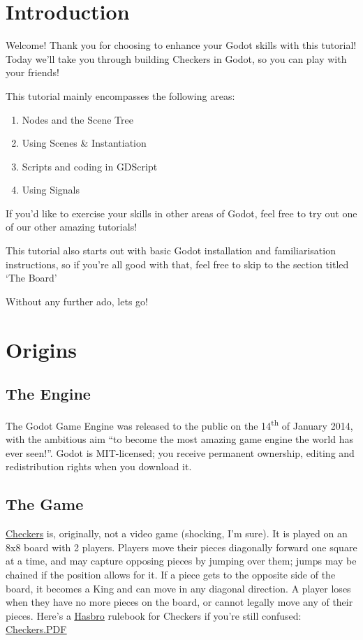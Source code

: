 \documentclass[14pt]{extarticle}
\begin{document}
%


\section{Introduction}
Welcome! Thank you for choosing to enhance your Godot skills with this tutorial! Today we'll take you through building Checkers in Godot, so you can play with your friends!

This tutorial mainly encompasses the following areas:
\begin{enumerate}
    \item Nodes and the Scene Tree
    \item Using Scenes \& Instantiation
    \item Scripts and coding in GDScript
    \item Using Signals
\end{enumerate}
If you'd like to exercise your skills in other areas of Godot, feel free to try out one of our other amazing tutorials!

This tutorial also starts out with basic Godot installation and familiarisation instructions, so if you're all good with that, feel free to skip to the section titled `The Board'

Without any further ado, lets go!

\section{Origins}
\subsection*{The Engine}
The Godot Game Engine was released to the public on the 14\textsuperscript{th} of January 2014, with the ambitious aim ``to become the most amazing game engine the world has ever seen!''.\cite{first-public-release-godot} Godot is MIT-licensed; you receive permanent ownership, editing and redistribution rights when you download it.

\subsection*{The Game}
\href{https://en.wikipedia.org/wiki/Checkers}{\underline{Checkers}} is, originally, not a video game (shocking, I'm sure). It is played on an 8x8 board with 2 players. Players move their pieces diagonally forward one square at a time, and may capture opposing pieces by jumping over them; jumps may be chained if the position allows for it. If a piece gets to the opposite side of the board, it becomes a King and can move in any diagonal direction. A player loses when they have no more pieces on the board, or cannot legally move any of their pieces. Here's a \href{https://en.wikipedia.org/wiki/Hasbro}{\underline{Hasbro}} rulebook for Checkers if you're still confused:  \href{https://www.hasbro.com/common/instruct/Checkers.PDF}{\underline{Checkers.PDF}}
\end{document}
